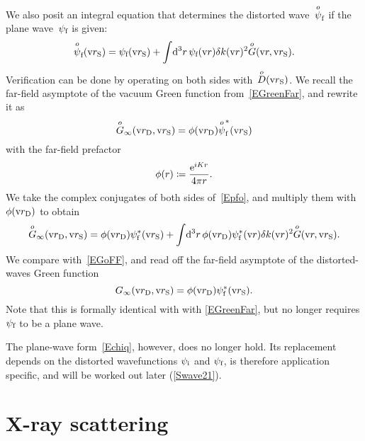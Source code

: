 We also posit an integral equation that determines the distorted wave~$\pfo$
if the plane wave~$\psi_\sf$ is given:
\begin{equation}\label{Epfo}
  \pfo(\rS) = \psi_\sf(\rS) + \int\!\d^3r\, \psi_\sf(\r)\delta k(\r)^2 \Go(\r,\rS).
\end{equation}
Verification can be done by operating on both sides with~$\Do(\rS)$.
We recall the far-field asymptote of the vacuum Green function from~\cref{EGreenFar},
and rewrite it as
\begin{equation}
  \Go_\infty(\rD,\rS) = \phi(\rD)\pfo^*(\rS)
\end{equation}
with the far-field prefactor
\begin{equation}\label{Effphidef}
  \phi(r) \coloneqq \frac{\e^{iKr}}{4\pi r}.
\end{equation}
We take the complex conjugates of both sides of~\cref{Epfo},
 and multiply them with $\phi(\rD)$ to obtain
\begin{equation}\label{Epfo2}
  \Go_\infty(\rD,\rS)
  = \phi(\rD)\psi^*_\sf(\rS) + \int\!\d^3r\, \phi(\rD)\psi^*_\sf(\r)\delta k(\r)^2 \Go(\r,\rS).
\end{equation}
We compare with~\cref{EGoFF},
and read off the far-field asymptote of the distorted-waves Green function
\begin{equation}
  G_\infty(\rD,\rS) = \phi(\rD)\psi^*_\sf(\rS).
\end{equation}
Note that this is formally identical with with \cref{EGreenFar},
but no longer requires $\psi_\sf$ to be a plane wave.
%

%
%
%
%
The plane-wave form~\cref{Echiq}, however, does no longer hold.
Its replacement depends on the distorted wavefunctions
$\psi_\si$ and $\psi_\sf$,
is therefore application specific,
and will be worked out later (\cref{Swave21}).

%

\section{X-ray scattering}\label{SXray}
%

